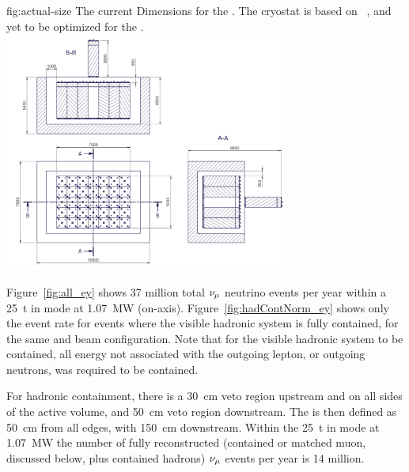 \begin{dunefigure}{fig:actual-size}
{The current  Dimensions for the   . The cryostat is based on ~\cite{Abi:2017aow}, and yet to be optimized for the   .}
	\includegraphics[width=0.7\textwidth]{graphics/actual-size.png}
\end{dunefigure}

\label{sec:appx-nd::rates}

Figure~\ref{fig:all_ey} shows 37 million total  $\nu_\mu$ neutrino events per year within a \SI{25}{\tonne}  in  mode at \SI{1.07}{\mega\watt} (on-axis). Figure~\ref{fig:hadContNorm_ey} shows only the event rate for events where the visible hadronic system is fully contained, for the same  and beam configuration. Note that for the visible hadronic system to be contained, all energy not associated with the outgoing lepton, or outgoing neutrons, was required to be contained. 


For hadronic containment, there is a \SI{30}{\centi\metre} veto region upstream and on all sides of the active volume, and \SI{50}{\centi\metre} veto region downstream. The  is then defined as \SI{50}{\centi\metre} from all edges, with \SI{150}{\centi\metre} downstream.  Within the \SI{25}{\tonne}  in  mode at \SI{1.07}{\mega\watt} the number of fully reconstructed (contained or matched muon, discussed below, plus contained hadrons)  $\nu_\mu$ events per year is 14 million.   


